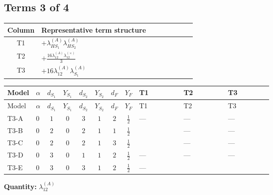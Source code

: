 \documentclass[8pt]{article}
\begin{document}
\begin{landscape}
\subsection*{Terms 3 of 4}
\begin{center}
\begin{tabular}{@{}c >{\raggedright\arraybackslash}p{0.82\linewidth}@{}}
\toprule
Column & Representative term structure \\
\midrule
T1 & \(\displaystyle +{\lambda_{HS_1}^{(A)}} {\lambda_{HS_2}^{(A)}}\) \\
\midrule
T2 & \(\displaystyle +\frac{16 {\lambda_{12}^{(A)}} {\lambda_{12}^{(\times)}}}{3}\) \\
\midrule
T3 & \(\displaystyle +16 {\lambda_{12}^{(A)}} {\lambda_{S_1}^{(A)}}\) \\
\midrule
\bottomrule
\end{tabular}
\end{center}
\smallskip
\tiny
\begin{longtable}{@{}llcccccc >{\raggedright\arraybackslash}p{0.21\linewidth} >{\raggedright\arraybackslash}p{0.21\linewidth} >{\raggedright\arraybackslash}p{0.21\linewidth}@{}}
\toprule
Model & $\alpha$ & $d_{S_1}$ & $Y_{S_1}$ & $d_{S_2}$ & $Y_{S_2}$ & $d_F$ & $Y_F$ & T1 & T2 & T3 \\
\midrule
\endfirsthead
\toprule
Model & $\alpha$ & $d_{S_1}$ & $Y_{S_1}$ & $d_{S_2}$ & $Y_{S_2}$ & $d_F$ & $Y_F$ & T1 & T2 & T3 \\
\midrule
\endhead
T3-A & $0$ & $1$ & $0$ & $3$ & $1$ & $2$ & $\frac{1}{2}$ & --- & --- & --- \\
\midrule
T3-B & $0$ & $2$ & $0$ & $2$ & $1$ & $1$ & $\frac{1}{2}$ & \scriptsize\adjustbox{max width=\linewidth}{$\begin{gathered} +{\lambda_{HS_1}^{(A)}} {\lambda_{HS_2}^{(A)}}\end{gathered}$} & --- & --- \\
\midrule
T3-C & $0$ & $2$ & $0$ & $2$ & $1$ & $3$ & $\frac{1}{2}$ & \scriptsize\adjustbox{max width=\linewidth}{$\begin{gathered} +{\lambda_{HS_1}^{(A)}} {\lambda_{HS_2}^{(A)}}\end{gathered}$} & --- & --- \\
\midrule
T3-D & $0$ & $3$ & $0$ & $1$ & $1$ & $2$ & $\frac{1}{2}$ & --- & --- & --- \\
\midrule
T3-E & $0$ & $3$ & $0$ & $3$ & $1$ & $2$ & $\frac{1}{2}$ & --- & \scriptsize\adjustbox{max width=\linewidth}{$\begin{gathered} +\frac{16 {\lambda_{12}^{(A)}} {\lambda_{12}^{(\times)}}}{3}\end{gathered}$} & \scriptsize\adjustbox{max width=\linewidth}{$\begin{gathered} +16 {\lambda_{12}^{(A)}} {\lambda_{S_1}^{(A)}}\end{gathered}$} \\
\midrule
\bottomrule
\end{longtable}
\clearpage
\noindent\textbf{Quantity: }$\lambda_{12}^{(A)}$\par\smallskip

\end{landscape}
\end{document}
